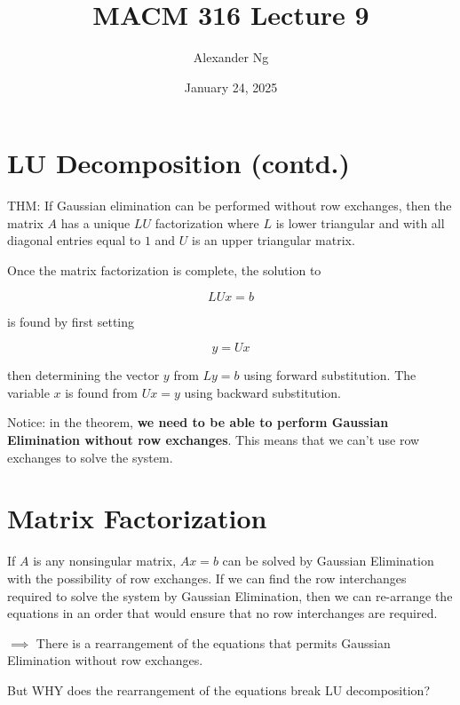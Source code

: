 \documentclass[12pt]{article}
\begin{document}
\renewcommand{\arraystretch}{1.25} %
\setlength{\arraycolsep}{12pt}

\title{MACM 316 Lecture 9}
\author{Alexander Ng}
\date{January 24, 2025}

\maketitle

\section{LU Decomposition (contd.)}

THM: If Gaussian elimination can be performed without row exchanges, then the
matrix $A$ has a unique $LU$ factorization where $L$ is lower triangular and
with all diagonal entries equal to $1$ and $U$ is an upper triangular matrix.

Once the matrix factorization is complete, the solution to

\begin{equation*}
  LUx = b
\end{equation*}

is found by first setting 

\begin{equation*}
  y=Ux
\end{equation*}

then determining the vector $y$ from $Ly=b$ using forward substitution. The
variable $x$ is found from $Ux=y$ using backward substitution.

Notice: in the theorem, \textbf{we need to be able to perform Gaussian
Elimination without row exchanges}. This means that we can't use row
exchanges to solve the system.

\section{Matrix Factorization}

If $A$ is any nonsingular matrix, $Ax=b$ can be solved by Gaussian Elimination
with the possibility of row exchanges. If we can find the row interchanges
required to solve the system by Gaussian Elimination, then we can re-arrange
the equations in an order that would ensure that no row interchanges are
required.

$\implies$ There is a rearrangement of the equations that permits Gaussian
Elimination without row exchanges.

But WHY does the rearrangement of the equations break LU decomposition?
\end{document}
